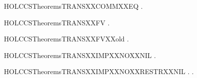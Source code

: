 \newcommand{\HOLCCSTheoremsTRANSXXcases}{\UseVerbatim{HOLCCSTheoremsTRANSXXcases}}
\begin{SaveVerbatim}{HOLCCSTheoremsTRANSXXCOMMXXEQ}
\HOLTokenTurnstile{} \HOLSymConst{\HOLTokenForall{}}   .  \HOLSymConst{\ensuremath{+}}  \HOLTokenTransBegin{}\HOLTokenTransEnd {} \HOLSymConst{\HOLTokenEquiv{}}  \HOLSymConst{\ensuremath{+}}  \HOLTokenTransBegin{}\HOLTokenTransEnd {}
\end{SaveVerbatim}
\newcommand{\HOLCCSTheoremsTRANSXXCOMMXXEQ}{\UseVerbatim{HOLCCSTheoremsTRANSXXCOMMXXEQ}}
\begin{SaveVerbatim}{HOLCCSTheoremsTRANSXXFV}
\HOLTokenTurnstile{} \HOLSymConst{\HOLTokenForall{}}  .  \HOLTokenTransBegin{}\HOLTokenTransEnd {} \HOLSymConst{\HOLTokenImp{}}   \HOLConst{\HOLTokenSubset{}}  
\end{SaveVerbatim}
\newcommand{\HOLCCSTheoremsTRANSXXFV}{\UseVerbatim{HOLCCSTheoremsTRANSXXFV}}
\begin{SaveVerbatim}{HOLCCSTheoremsTRANSXXFVXXold}
\HOLTokenTurnstile{} \HOLSymConst{\HOLTokenForall{}}  .  \HOLTokenTransBegin{}\HOLTokenTransEnd {} \HOLSymConst{\HOLTokenImp{}}   \HOLConst{\HOLTokenSubset{}}   \HOLConst{\HOLTokenUnion{}}  
\end{SaveVerbatim}
\newcommand{\HOLCCSTheoremsTRANSXXFVXXold}{\UseVerbatim{HOLCCSTheoremsTRANSXXFVXXold}}
\begin{SaveVerbatim}{HOLCCSTheoremsTRANSXXIMPXXNOXXNIL}
\HOLTokenTurnstile{} \HOLSymConst{\HOLTokenForall{}}  .  \HOLTokenTransBegin{}\HOLTokenTransEnd {} \HOLSymConst{\HOLTokenImp{}}  \HOLSymConst{\HOLTokenNotEqual{}} 
\end{SaveVerbatim}
\newcommand{\HOLCCSTheoremsTRANSXXIMPXXNOXXNIL}{\UseVerbatim{HOLCCSTheoremsTRANSXXIMPXXNOXXNIL}}
\begin{SaveVerbatim}{HOLCCSTheoremsTRANSXXIMPXXNOXXRESTRXXNIL}
\HOLTokenTurnstile{} \HOLSymConst{\HOLTokenForall{}}  .  \HOLTokenTransBegin{}\HOLTokenTransEnd {} \HOLSymConst{\HOLTokenImp{}} \HOLSymConst{\HOLTokenForall{}}.  \HOLSymConst{\HOLTokenNotEqual{}} \HOLConst{\ensuremath{\nu}}  
\end{SaveVerbatim}
